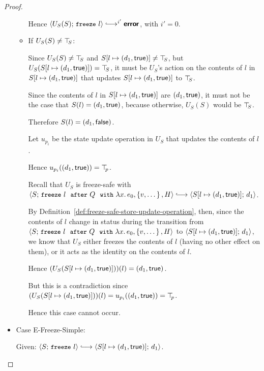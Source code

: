 \begin{proof}
\begin{itemize}
\begin{itemize}
      Hence $\config{U_S(S)}{\freeze{l}}
      \parstepsto^{i'} \error$, with $i' = 0$.

    \item If $U_S(S) \neq \top\hspace{-0.85mm}_{S}$:

      Since $U_S(S) \neq \top\hspace{-0.85mm}_{S}$ and $S[l \mapsto (d_1, \textsf{true})]
      \neq \top\hspace{-0.85mm}_{S}$, but $U_S(S[l \mapsto (d_1, \textsf{true})]) = \top\hspace{-0.85mm}_{S}$,
      it must be $U_S$'s action on the contents of $l$ in
      $S[l \mapsto (d_1, \textsf{true})]$ that updates
      $S[l \mapsto (d_1, \textsf{true})]$ to $\top\hspace{-0.85mm}_{S}$.

      Since the contents of $l$ in $S[l \mapsto (d_1, \textsf{true})]$ are
      $(d_1, \textsf{true})$, it must not be the case that $S(l) =
      (d_1, \textsf{true})$, because otherwise, $U_S(S)$ would be
      $\top\hspace{-0.85mm}_{S}$.

      Therefore $S(l) = (d_1, \textsf{false})$.

      Let $u_{p_i}$ be the state update operation in $U_S$ that
      updates the contents of $l$.

      Hence $u_{p_i}((d_1, \textsf{true})) = \top\hspace{-0.85mm}_{p}$.

      Recall that $U_S$ is freeze-safe with
      $\config{S}{\freezeafterfull{l}{Q}{\lam{x}{e_0}}{\setof{v,
            \dots}}{H}} \parstepsto
      \config{\extS{S}{l}{d_1}{\frozentrue}}{d_1}$.

      By Definition~\ref{def:freeze-safe-store-update-operation},
      then, since the contents of $l$ change in status during the
      transition from
      $\langle S;\, \mbox{\small{\texttt{freeze}}}~l~~{\mbox{\small{\texttt{after}}}}~Q~~{\mbox{\small{\texttt{with}}}}~\lambda x.\,e_0, \left\{v,
            \dots\right\}, H \rangle$ to
      $\langle S[l \mapsto (d_1, \textsf{true})];\, d_1 \rangle$, we know that
      $U_S$ either freezes the contents of $l$ (having no other effect
      on them), or it acts as the identity on the contents of $l$.

      Hence $(U_S(S[l \mapsto (d_1, \textsf{true})]))(l) =
      (d_1, \textsf{true})$.

      But this is a contradiction since
      $(U_S(S[l \mapsto (d_1, \textsf{true})]))(l) =
      u_{p_i}((d_1, \textsf{true})) = \top\hspace{-0.85mm}_{p}$.

      Hence this case cannot occur.
    \end{itemize}

  \item Case {\sc E-Freeze-Simple}:

    Given: $\config{S}{\freeze{l}} \parstepsto
    \config{\extS{S}{l}{d_1}{\frozentrue}}{d_1}$.


\end{itemize}
\end{proof}
